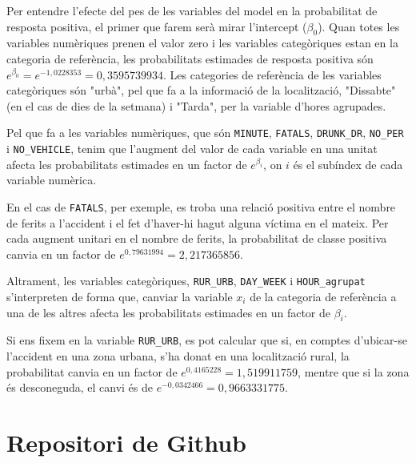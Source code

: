 \documentclass[11pt,longbibliography]{article}
\theoremstyle{definition}
\theoremstyle{remark}
\begin{document}
Per entendre l'efecte del pes de les variables del model en la probabilitat de resposta positiva, el primer que farem serà mirar l'intercept ($\beta_0$). Quan totes les variables numèriques prenen el valor zero i les variables categòriques estan en la categoria de referència, les probabilitats estimades de resposta positiva són $e^{\beta_0} = e^{-1,0228353} = 0,3595739934$. Les categories de referència de les variables categòriques són "urbà", pel que fa a la informació de la localització, "Dissabte" (en el cas de dies de la setmana) i "Tarda", per la variable d'hores agrupades.

Pel que fa a les variables numèriques, que són \texttt{MINUTE}, \texttt{FATALS}, \texttt{DRUNK\_DR}, \texttt{NO\_PER} i \texttt{NO\_VEHICLE}, tenim que l'augment del valor de cada variable en una unitat afecta les probabilitats estimades en un factor de $e^{\beta_i}$, on $i$ és el subíndex de cada variable numèrica.


En el cas de \texttt{FATALS}, per exemple, es troba una relació positiva entre el nombre de ferits a l'accident i el fet d'haver-hi hagut alguna víctima en el mateix. Per cada augment unitari en el nombre de ferits, la probabilitat de classe positiva canvia en un factor de $e^{0,79631994} = 2,217365856$.


Altrament, les variables categòriques, \texttt{RUR\_URB}, \texttt{DAY\_WEEK} i \texttt{HOUR\_agrupat} s'interpreten de forma que, canviar la variable $x_i$ de la categoria de referència a una de les altres afecta les probabilitats estimades en un factor de $\beta_i$.


Si ens fixem en la variable \texttt{RUR\_URB}, es pot calcular que si, en comptes d'ubicar-se l'accident en una zona urbana, s'ha donat en una localització rural, la probabilitat canvia en un factor de $e^{0,4165228} = 1,519911759$, mentre que si la zona és desconeguda, el canvi és de $e^{-0,0342466} = 0,9663331775$.


\newpage

\section{Repositori de Github}

\newpage

\listoffigures

\newpage

\listoftables
\end{document}
